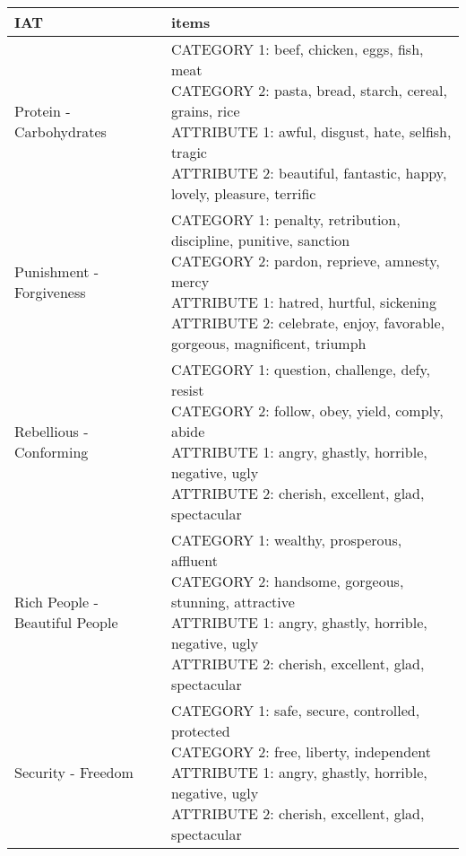 \documentclass[]{article}
\begin{document}
\begin{table}[H]
\centering\begingroup\fontsize{7}{9}\selectfont

\begin{tabular}{l|l}
\hline
IAT & items\\
\hline
Protein - Carbohydrates & \makecell[l]{CATEGORY 1:  beef, chicken, eggs, fish, meat \\ CATEGORY 2:  pasta, bread, starch, cereal, grains, rice \\ ATTRIBUTE 1:  awful, disgust, hate, selfish, tragic \\ ATTRIBUTE 2:  beautiful, fantastic, happy, lovely, pleasure, terrific \\}\\
\hline
Punishment - Forgiveness & \makecell[l]{CATEGORY 1:  penalty, retribution, discipline, punitive, sanction \\ CATEGORY 2:  pardon, reprieve, amnesty, mercy \\ ATTRIBUTE 1:  hatred, hurtful, sickening \\ ATTRIBUTE 2:  celebrate, enjoy, favorable, gorgeous, magnificent, triumph \\}\\
\hline
Rebellious - Conforming & \makecell[l]{CATEGORY 1:  question, challenge, defy, resist \\ CATEGORY 2:  follow, obey, yield, comply, abide \\ ATTRIBUTE 1:  angry, ghastly, horrible, negative, ugly \\ ATTRIBUTE 2:  cherish, excellent, glad, spectacular \\}\\
\hline
Rich People - Beautiful People & \makecell[l]{CATEGORY 1:  wealthy, prosperous, affluent \\ CATEGORY 2:  handsome, gorgeous, stunning, attractive \\ ATTRIBUTE 1:  angry, ghastly, horrible, negative, ugly \\ ATTRIBUTE 2:  cherish, excellent, glad, spectacular \\}\\
\hline
Security - Freedom & \makecell[l]{CATEGORY 1:  safe, secure, controlled, protected \\ CATEGORY 2:  free, liberty, independent \\ ATTRIBUTE 1:  angry, ghastly, horrible, negative, ugly \\ ATTRIBUTE 2:  cherish, excellent, glad, spectacular \\}\\

\end{tabular}
\end{table}
\end{document}
